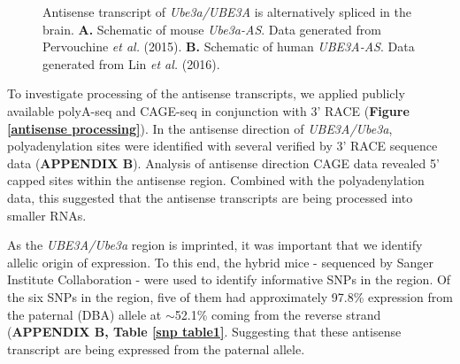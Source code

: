 \begin{figure}
  \centering
  \caption{Antisense transcript of \textit{Ube3a/UBE3A} is alternatively spliced in the brain. \textbf{A.} Schematic of mouse \textit{Ube3a-AS}. Data generated from Pervouchine \textit{et al.} (2015). \textbf{B.} Schematic of human \textit{UBE3A-AS}. Data generated from Lin \textit{et al.} (2016).}
  \label{genome annotation}
\end{figure}

To investigate processing of the antisense transcripts, we applied publicly available polyA-seq and CAGE-seq in conjunction with 3' RACE (\textbf{Figure \ref{antisense processing}}). In the antisense direction of \textit{UBE3A/Ube3a}, polyadenylation sites were identified with several verified by 3' RACE sequence data (\textbf{APPENDIX B}). Analysis of antisense direction CAGE data revealed 5' capped sites within the antisense region. Combined with the polyadenylation data, this suggested that the antisense transcripts are being processed into smaller RNAs.

As the \textit{UBE3A/Ube3a} region is imprinted, it was important that we identify allelic origin of expression. To this end, the hybrid mice - sequenced by Sanger Institute Collaboration - were used to identify informative SNPs in the region. Of the six SNPs in the region, five of them had approximately 97.8\% expression from the paternal (DBA) allele at $\sim$52.1\% coming from the reverse strand (\textbf{APPENDIX B, Table \ref{snp table1}}. Suggesting that these antisense transcript are being expressed from the paternal allele.

